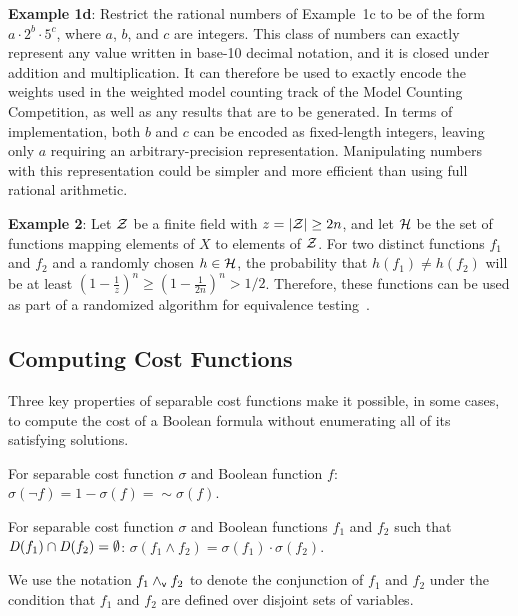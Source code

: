 \documentclass{llncs}
\newcommand{\pand}{\mathbin{\land_{\sf v}}}
\newcommand{\oneminus}{{\sim}}
\newcommand{\ring}{{\cal Z}}
\newcommand{\cost}{\sigma}
\newcommand{\hashset}{{\cal H}}
\newcommand{\fhash}{h}
\newcommand{\depend}{{\it D}}
\begin{document}
{\bf Example 1d}: Restrict the rational numbers of Example~1c to be of
the form $a\cdot 2^b\cdot 5^c$, where $a$, $b$, and $c$ are integers.
This class of numbers can exactly represent any value written in
base-10 decimal notation, and it is closed under addition and
multiplication.  It can therefore be used to exactly
encode the weights used in the weighted model counting track of the
Model Counting Competition, as well as any results that are to be
generated.  In terms of implementation, both $b$ and $c$ can be encoded
as fixed-length integers, leaving only $a$ requiring an
arbitrary-precision representation.  Manipulating numbers with this
representation could be simpler and more efficient than using full rational
arithmetic.

{\bf Example 2}: Let $\ring$ be a finite field with $z = |\ring| \geq 2n$,
and let $\hashset$ be the set of functions
mapping elements of $X$ to elements of $\ring$.  For
two distinct functions $f_1$ and $f_2$ and a randomly chosen $\fhash
\in \hashset$, the probability that $h(f_1) \not = h(f_2)$ will be at least
$\left(1-\frac{1}{z}\right)^n \geq \left(1-\frac{1}{2n}\right)^n >  1/2$.  Therefore, these functions can be used as part of a
randomized algorithm for equivalence testing~\cite{blum:ipl:1980}.

\subsection{Computing Cost Functions}

Three key properties of separable cost functions make it possible, in
some cases, to compute the cost of a Boolean formula without
enumerating all of its satisfying solutions.


\begin{proposition}[Negation]
\label{prop:negation}
  For separable cost function $\cost$ and Boolean function $f$:
  $\cost(\neg f) = 1 - \cost(f) = \oneminus \cost(f)$.
\end{proposition}

\begin{proposition}
\label{prop:conjunction}
  For separable cost function $\cost$ and Boolean functions $f_1$ and $f_2$ such that $\depend(f_1) \cap \depend(f_2) = \emptyset$:
    $\cost(f_1 \land f_2) = \cost(f_1) \cdot \cost(f_2)$.
\end{proposition}
We use the notation $f_1 \pand f_2$ to denote the conjunction of $f_1$ and
$f_2$ under the condition that $f_1$ and $f_2$ are defined over
disjoint sets of variables.
\end{document}
